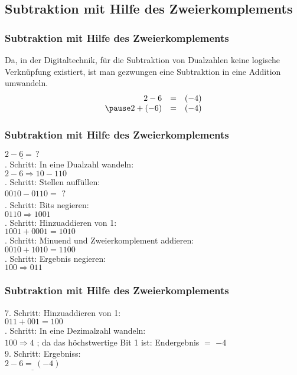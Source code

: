 \documentclass{beamer}
\begin{document}
\subsection{Subtraktion mit Hilfe des Zweierkomplements}
\begin{frame} 		
	\frametitle{Subtraktion mit Hilfe des Zweierkomplements}
	Da, in der Digitaltechnik, für die Subtraktion von Dualzahlen keine logische Verknüpfung existiert, ist man gezwungen eine
	Subtraktion in eine Addition umwandeln. \pause
		\[ \begin{array}{rcl}
   				 2 - 6       & = & (-4)			\\ \pause 
  			         2 + (-6)   & = & (-4)
		\end{array} \]
\end{frame}


\begin{frame} 		
	\frametitle{Subtraktion mit Hilfe des Zweierkomplements}
		\hspace*{5mm} $ \underline{2 - 6 = \, ? }$ \\ . Schritt: In eine Dualzahl wandeln:\\  
		\hspace*{5mm}  $ 2 - 6 \Rightarrow 10 - 110$\\ . Schritt: Stellen auffüllen:\\ 
		\hspace*{5mm} $ 0010 - 0110 =$ $ ? $\\. Schritt: Bits negieren:\\
		\hspace*{5mm} $ 0110 \Rightarrow 1001$\\ . Schritt: Hinzuaddieren von 1:\\ 
		\hspace*{5mm} $ 1001 + 0001 = 1010$\\ . Schritt: Minuend und Zweierkomplement addieren:\\ 
		\hspace*{5mm} $ 0010 + 1010 = 1100$\\ . Schritt: Ergebnis negieren:\\ 
		\hspace*{5mm} $ 100 \Rightarrow 011$\\ 
		\end{frame}
\begin{frame} 		
	\frametitle{Subtraktion mit Hilfe des Zweierkomplements}
		7. Schritt: Hinzuaddieren von 1:\\
		\hspace*{5mm} $ 011 + 001 = 100$\\ . Schritt: In eine Dezimalzahl wandeln:\\ 
		\hspace*{5mm} $ 100 \Rightarrow 4$ ; da das höchstwertige Bit 1 ist: Endergebnis $=$ $ -4$\\
		9. Schritt: Ergebniss:\\ 
		\hspace*{5mm} $ \underline{2 - 6 = \, (-4) }$
\end{frame}
\end{document}
